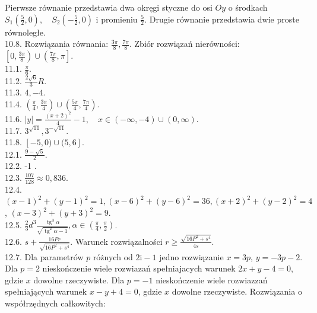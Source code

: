 \documentclass[10pt]{article}
\begin{document}
Pierwsze równanie przedstawia dwa okręgi styczne do osi $O y$ o środkach $S_{1}\left(\frac{5}{2}, 0\right), \quad S_{2}\left(-\frac{5}{2}, 0\right)$ i promieniu $\frac{5}{2}$. Drugie równanie przedstawia dwie proste równoległe.\\
10.8. Rozwiązania równania: $\frac{3 \pi}{8}, \frac{7 \pi}{8}$. Zbiór rozwiązań nierówności: $\left[0, \frac{3 \pi}{8}\right) \cup\left(\frac{7 \pi}{8}, \pi\right]$.\\
11.1. $\frac{\pi}{6}$.\\
11.2. $\frac{2 \sqrt{6}}{3} R$.\\
11.3. $4,-4$.\\
11.4. $\left(\frac{\pi}{4}, \frac{3 \pi}{4}\right) \cup\left(\frac{5 \pi}{4}, \frac{7 \pi}{4}\right)$.\\
11.6. $|y|=\frac{(x+2)^{2}}{4}-1, \quad x \in(-\infty,-4) \cup(0, \infty)$.\\
11.7. $3^{\sqrt{11}}, 3^{-\sqrt{11}}$.\\
11.8. $[-5,0) \cup(5,6]$.\\
12.1. $\frac{9-\sqrt{5}}{2}$.\\
12.2. -1 .\\
12.3. $\frac{107}{128} \approx 0,836$.\\
12.4. $(x-1)^{2}+(y-1)^{2}=1,(x-6)^{2}+(y-6)^{2}=36,(x+2)^{2}+(y-2)^{2}=4$, $(x-3)^{2}+(y+3)^{2}=9$.\\
12.5. $\frac{2}{3} d^{3} \frac{\operatorname{tg}^{3} \alpha}{\sqrt{\operatorname{tg}^{2} \alpha-1}}, \alpha \in\left(\frac{\pi}{4}, \frac{\pi}{2}\right)$.\\
12.6. $s+\frac{16 P r}{\sqrt{16 P^{2}+s^{4}}}$. Warunek rozwiązalności $r \geq \frac{\sqrt{16 P^{2}+s^{4}}}{4 s}$.\\
12.7. Dla parametrów $p$ różnych od $2 \mathrm{i}-1$ jedno rozwiązanie $x=3 p$, $y=-3 p-2$. Dla $p=2$ nieskończenie wiele rozwiazań spełniajacych warunek $2 x+y-4=0$, gdzie $x$ dowolne rzeczywiste. Dla $p=-1$ nieskończenie wiele rozwiazzań spełniających warunek $x-y+4=0$, gdzie $x$ dowolne rzeczywiste. Rozwiązania o współrzędnych całkowitych:
\end{document}
